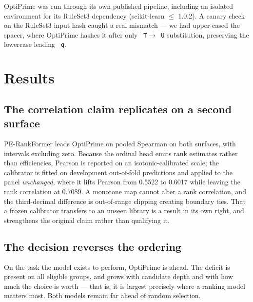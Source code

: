 \documentclass[11pt]{article}
\newcommand{\code}[1]{\texttt{\small\begingroup\hyphenpenalty=10000 #1\endgroup}}
\begin{document}
OptiPrime was run through its own published pipeline, including an isolated environment for
its RuleSet3 dependency (scikit-learn $\leq$ 1.0.2). A canary check on the RuleSet3 input hash
caught a real mismatch --- we had upper-cased the spacer, where OptiPrime hashes it after only
\code{T}$\rightarrow$\code{U} substitution, preserving the lowercase leading \code{g}.

\section{Results}

\subsection{The correlation claim replicates on a second surface}



PE-RankFormer leads OptiPrime on pooled Spearman on both surfaces, with intervals excluding
zero. Because the ordinal head emits rank estimates rather than efficiencies, Pearson is
reported on an isotonic-calibrated scale; the calibrator is fitted on development out-of-fold
predictions and applied to the panel \emph{unchanged}, where it lifts Pearson from 0.5522 to
0.6017 while leaving the rank correlation at 0.7089. A monotone map cannot alter a rank
correlation, and the third-decimal difference is out-of-range clipping creating boundary ties.
That a frozen calibrator transfers to an unseen library is a result in its own right, and
strengthens the original claim rather than qualifying it.

\subsection{The decision reverses the ordering}

On the task the model exists to perform, OptiPrime is ahead. The deficit is present on all
eligible groups, and grows with candidate depth and with how much the choice is worth ---
that is, it is largest precisely where a ranking model matters most. Both models remain far
ahead of random selection.


\end{document}
